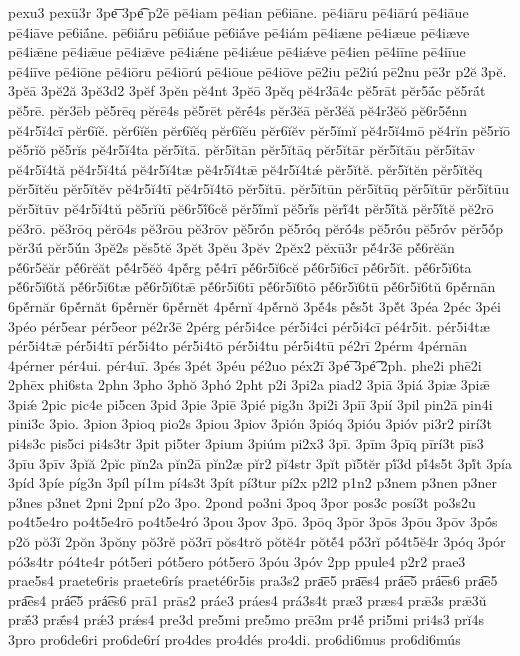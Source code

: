 {pexu3
pexū3r
3pe͞
3pe͡
p2ē
pē4iam
pē4ian
pē6iāne.
pē4iāru
pē4iārú
pē4iāue
pē4iāve
pē6iā́ne.
pē6iā́ru
pē6iā́ue
pē6iā́ve
pē4iám
pē4iæne
pē4iæue
pē4iæve
pē4iǣne
pē4iǣue
pē4iǣve
pē4iǽne
pē4iǽue
pē4iǽve
pē4ien
pē4iīne
pē4iīue
pē4iīve
pē4iōne
pē4iōru
pē4iōrú
pē4iōue
pē4iōve
pē2iu
pē2iú
pē2nu
pē3r
p2ĕ
3pĕ.
3pĕā
3pĕ2ă
3pĕ3d2
3pĕf
3pĕn
pĕ4nt
3pĕō
3pĕq
pĕ4r3ā4c
pĕ5rāt
pĕr5ā́c
pĕ5rā́t
pĕ5rē.
pĕr3ēb
pĕ5rēq
pĕrē4s
pĕ5rēt
pĕrḗ4s
pĕr3ĕā
pĕr3ĕă
pĕ4r3ĕŏ
pĕ6r5ĕ́nn
pĕ4r5ĭ4cī
pĕr6ĭĕ.
pĕr6ĭĕn
pĕr6ĭĕq
pĕr6ĭĕu
pĕr6ĭĕv
pĕr5ĭmĭ
pĕ4r5ĭ4mō
pĕ4rĭn
pĕ5rĭō
pĕ5rĭŏ
pĕ5rĭs
pĕ4r5ĭ4ta
pĕr5ĭtā.
pĕr5ĭtān
pĕr5ĭtāq
pĕr5ĭtār
pĕr5ĭtāu
pĕr5ĭtāv
pĕ4r5ĭ4tă
pĕ4r5ĭ4tá
pĕ4r5ĭ4tæ
pĕ4r5ĭ4tǣ
pĕ4r5ĭ4tǽ
pĕr5ĭtĕ.
pĕr5ĭtĕn
pĕr5ĭtĕq
pĕr5ĭtĕu
pĕr5ĭtĕv
pĕ4r5ĭ4tī
pĕ4r5ĭ4tō
pĕr5ĭtū.
pĕr5ĭtūn
pĕr5ĭtūq
pĕr5ĭtūr
pĕr5ĭtūu
pĕr5ĭtūv
pĕ4r5ĭ4tŭ
pĕ5rĭŭ
pĕ6r5ĭ́6cĕ
pĕr5ĭ́mĭ
pĕ5rĭ́s
pĕrĭ́4t
pĕr5ĭ́tă
pĕr5ĭ́tĕ
pĕ2rō
pĕ3rō.
pĕ3rōq
pĕrō4s
pĕ3rōu
pĕ3rōv
pĕ5rṓn
pĕ5rṓq
pĕrṓ4s
pĕ5rṓu
pĕ5rṓv
pĕr5ŏ́p
pĕr3ū́
pĕr5ŭ́n
3pĕ2s
pĕs5tĕ
3pĕt
3pĕu
3pĕv
2pĕx2
pĕxū3r
pĕ́4r3ē
pĕ́6rĕăn
pĕ́6r5ĕăr
pĕ́6rĕăt
pĕ́4r5ĕŏ
4pĕ́rg
pĕ́4rī
pĕ́6r5ĭ6cĕ
pĕ́6r5ĭ6cī
pĕ́6r5ĭt.
pĕ́6r5ĭ6ta
pĕ́6r5ĭ6tă
pĕ́6r5ĭ6tæ
pĕ́6r5ĭ6tǣ
pĕ́6r5ĭ6tī
pĕ́6r5ĭ6tō
pĕ́6r5ĭ6tū
pĕ́6r5ĭ6tŭ
6pĕ́rnān
6pĕ́rnăr
6pĕ́rnăt
6pĕ́rnĕr
6pĕ́rnĕt
4pĕ́rnĭ
4pĕ́rnŏ
3pĕ́4s
pĕ́s5t
3pĕ́t
3péa
2péc
3péi
3péo
pér5ear
pér5eor
pé2r3ē
2pérg
pér5i4ce
pér5i4ci
pér5i4cī
pé4r5it.
pér5i4tæ
pér5i4tǣ
pér5i4tī
pér5i4to
pér5i4tō
pér5i4tu
pér5i4tū
pé2rī
2pérm
4pérnān
4pérner
pér4ui.
pér4uī.
3pés
3pét
3péu
pé2uo
péx2ī
3pé͞
3pé͡
2ph.
phe2i
phē2i
2phēx
phi6sta
2phn
3pho
3phŏ
3phó
2pht
p2i
3pi2a
piad2
3piā
3piá
3piæ
3piǣ
3piǽ
2pic
pic4e
pi5cen
3pid
3pie
3piē
3pié
pig3n
3pi2i
3piī
3pií
3pil
pin2ā
pin4i
pini3c
3pio.
3pion
3pioq
pio2s
3piou
3piov
3pión
3pióq
3pióu
3pióv
pi3r2
pirí3t
pi4s3c
pis5ci
pi4s3tr
3pit
pi5ter
3pium
3piúm
pi2x3
3pī.
3pīm
3pīq
pīrí3t
pīs3
3pīu
3pīv
3pĭă
2pĭc
pĭn2a
pĭn2ā
pĭn2æ
pĭr2
pĭ4str
3pĭt
pĭ5tĕr
pĭ́3d
pĭ́4s5t
3pĭ́t
3pía
3píd
3píe
píg3n
3píl
pí1m
pí4s3t
3pít
pí3tur
pí2x
p2l2
p1n2
p3nem
p3nen
p3ner
p3nes
p3net
2pni
2pní
p2o
3po.
2pond
po3ni
3poq
3por
pos3c
posí3t
po3s2u
po4t5e4ro
po4t5e4rō
po4t5e4ró
3pou
3pov
3pō.
3pōq
3pōr
3pōs
3pōu
3pōv
3pṓs
p2ŏ
pŏ3ĭ
2pŏn
3pŏny
pŏ3rĕ
pŏ3rī
pŏs4trŏ
pŏtĕ4r
pŏtĕ́4
pŏ́3rĭ
pŏ́4t5ĕ4r
3póq
3pór
pó3s4tr
pó4te4r
pót5eri
pót5ero
pót5erō
3póu
3póv
2pp
ppule4
p2r2
prae3
prae5s4
praete6ris
praete6rís
praeté6r5is
pra3s2
pra͞e5
pra͞es4
prá͞e5
prá͞es6
pra͡e5
pra͡es4
prá͡e5
prá͡es6
prā1
prās2
práe3
práes4
prá3s4t
præ3
præs4
prǣ3s
prǣ3ŭ
prǣ́3
prǣ́s4
prǽ3
prǽs4
pre3d
pre5mi
pre5mo
prē3m
pr4ĕ́
pri5mi
pri4s3
prĭ4s
3pro
pro6de6ri
pro6de6rí
pro4des
pro4dés
pro4di.
pro6di6mus
pro6di6mús
}

